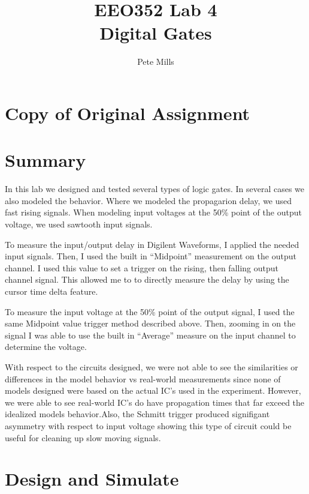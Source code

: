 \documentclass{article}
\begin{document}
	
	
	\title{EEO352 Lab 4\\Digital Gates}
	\author{Pete Mills}
	
	\maketitle
	
	\section*{Copy of Original Assignment}
	
	
	
	
	\section{Summary}
	
	In this lab we designed and tested several types of logic gates. In several cases we also modeled the behavior. Where we modeled the propagarion delay, we used fast rising signals. When modeling input voltages at the 50\% point of the output voltage, we used sawtooth input signals. 
	
	To measure the input/output delay in Digilent Waveforms, I applied the needed input signals. Then, I used the built in ``Midpoint'' measurement on the output channel. I used this value to set a trigger on the rising, then falling output channel signal. This allowed me to to directly measure the delay by using the cursor time delta feature.
	
	To measure the input voltage at the 50\% point of the output signal, I used the same Midpoint value \>\> trigger method described above. Then, zooming in on the signal I was able to use the built in ``Average'' measure on the input channel to determine the voltage.
	
	With respect to the circuits designed, we were not able to see the similarities or differences in the model behavior vs real-world measurements since none of models designed were based on the actual IC's used in the experiment. However, we were able to see real-world IC's do have propagation times that far exceed the idealized models behavior.Also, the Schmitt trigger produced signifigant asymmetry with respect to input voltage showing this type of circuit could be useful for cleaning up slow moving signals.
	
	\section{Design and Simulate}
	
\end{document}
